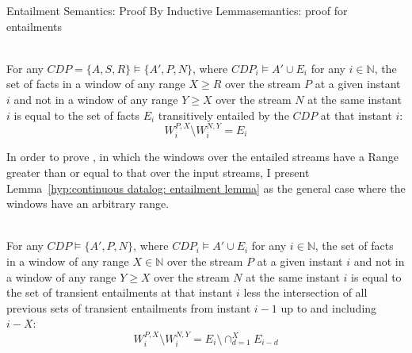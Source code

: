 \begin{nestedsection}{Entailment Semantics: Proof By Inductive Lemma}{semantics: proof for entailments}
	\begin{thrm} \hfill \\
		For any ${CDP = \{A,S,R\} \vDash \{A',P,N\}}$, where ${CDP_{i} \vDash A' \cup E_{i}}$ for any ${i \in \mathbb{N}}$, the set of facts in a window of any range ${X \geq R}$ over the stream $P$ at a given instant ${i}$ and not in a window of any range ${Y \geq X}$ over the stream $N$ at the same instant $i$ is equal to the set of facts $E_{i}$ transitively entailed by the ${CDP}$ at that instant $i$:
		\begin{equation*}
			W^{P,X}_{i} \setminus W^{N,Y}_{i} = E_{i}
		\end{equation*}
	\end{thrm}
	In order to prove , in which the windows over the entailed streams have a Range greater than or equal to that over the input streams, I present Lemma~\ref{hyp:continuous datalog: entailment lemma} as the general case where the windows have an arbitrary range.
	\begin{lem}\label{hyp:continuous datalog: entailment lemma} \hfill \\
		For any ${CDP \vDash \{A',P,N\}}$, where ${CDP_{i} \vDash A' \cup E_{i}}$ for any ${i \in \mathbb{N}}$, the set of facts in a window of any range ${X \in \mathbb{N}}$ over the stream $P$ at a given instant ${i}$ and not in a window of any range ${Y \geq X}$ over the stream $N$ at the same instant $i$ is equal to the set of transient entailments at that instant $i$ less the intersection of all previous sets of transient entailments from instant ${i-1}$ up to and including ${i-X}$:
		\begin{equation*}
			W^{P,X}_{i} \setminus W^{N,Y}_{i} = E_{i} \setminus \mathop{\cap}^{X}_{d=1} E_{i-d}
		\end{equation*}
	\end{lem}


\end{nestedsection}

